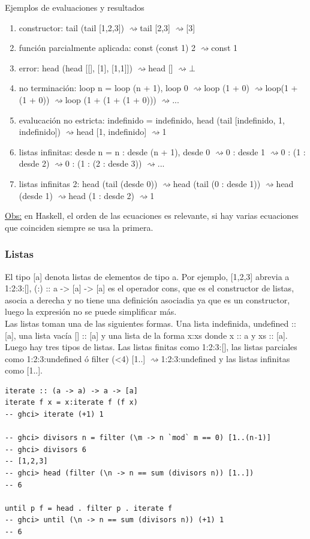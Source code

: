 \documentclass[12pt]{extarticle}
\def\observacion{\underline{Obs:} }
\def\eval{$\rightsquigarrow$}
\begin{document}
Ejemplos de evaluaciones y resultados
\begin{enumerate}
\itemsep-0.35em 
\item constructor: tail (tail [1,2,3]) \eval tail [2,3] \eval [3]
\item función parcialmente aplicada: const (const 1) 2 \eval const 1
\item error: head (head [[], [1], [1,1]]) \eval head [] \eval $\bot$
\item no terminación: loop n = loop (n + 1), loop 0 \eval loop (1 + 0) \eval loop(1 + (1 + 0)) \eval loop (1 + (1 + (1 + 0))) \eval ...
\item evalucación no estricta: indefinido = indefinido, head (tail [indefinido, 1, indefinido]) \eval head [1, indefinido] \eval 1
\item listas infinitas: desde n = n : desde (n + 1), desde 0 \eval 0 : desde 1 \eval 0 : (1 : desde 2) \eval 0 : (1 : (2 : desde 3)) \eval ...
\item listas infinitas 2: head (tail (desde 0)) \eval head (tail (0 : desde 1)) \eval head (desde 1) \eval head (1 : desde 2) \eval 1
\end{enumerate}

\observacion en Haskell, el orden de las ecuaciones es relevante, si hay varias ecuaciones que coinciden siempre se usa la primera.

\subsubsection{Listas}
El tipo [a] denota listas de elementos de tipo a. Por ejemplo, [1,2,3] abrevia a 1:2:3:[], (:) :: a -> [a] -> [a] es el operador cons, que es el constructor de listas, asocia a derecha y no tiene una definición asociadia ya que es un constructor, luego la expresión no se puede simplificar más. \\
Las listas toman una de las siguientes formas. Una lista indefinida, undefined :: [a], una lista vacía [] :: [a] y una lista de la forma x:xs donde x :: a y xs :: [a]. \\
Luego hay tres tipos de listas. Las listas finitas como 1:2:3:[], las listas parciales como 1:2:3:undefined ó filter (<4) [1..] \eval 1:2:3:undefined y las listas infinitas como [1..]. \\

\begin{verbatim}
iterate :: (a -> a) -> a -> [a]
iterate f x = x:iterate f (f x)
-- ghci> iterate (+1) 1

-- ghci> divisors n = filter (\m -> n `mod` m == 0) [1..(n-1)]
-- ghci> divisors 6
-- [1,2,3]
-- ghci> head (filter (\n -> n == sum (divisors n)) [1..])
-- 6

until p f = head . filter p . iterate f
-- ghci> until (\n -> n == sum (divisors n)) (+1) 1
-- 6
\end{verbatim}
\end{document}
